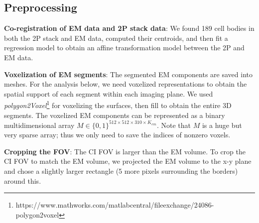 \documentclass[10pt,letterpaper]{article}
\begin{document}
\subsection{Preprocessing}\label{sec:pi}

\noindent\textbf{Co-registration of EM data and 2P stack data}: We found 189 cell bodies in both the 2P stack and EM data, computed their centroids, and then fit a regression model to obtain an affine transformation model between the 2P and EM data. 
\bigbreak

\noindent\textbf{Voxelization of EM segments}: The segmented EM components are saved into meshes. For the  analysis below, we need voxelized representations to obtain the spatial support of each segment within each imaging plane. We used {\it polygon2Voxel}\footnote{https://www.mathworks.com/matlabcentral/fileexchange/24086-polygon2voxel} for voxelizing the surfaces, then fill to obtain the entire 3D segments.  The voxelized EM components can be represented as a binary multidimensional array $M\in \{0, 1\}^{512\times 512\times 310 \times K_{em}}$. Note that $M$ is a huge but very sparse array; thus we only need to save the indices of nonzero voxels.
\bigbreak

\noindent\textbf{Cropping the FOV}: The CI FOV is larger than the EM volume.  To crop the CI FOV to match the EM volume, we projected the EM volume to the x-y plane and chose a slightly larger rectangle (5 more pixels surrounding the borders) around this. 
\bigbreak
\end{document}
